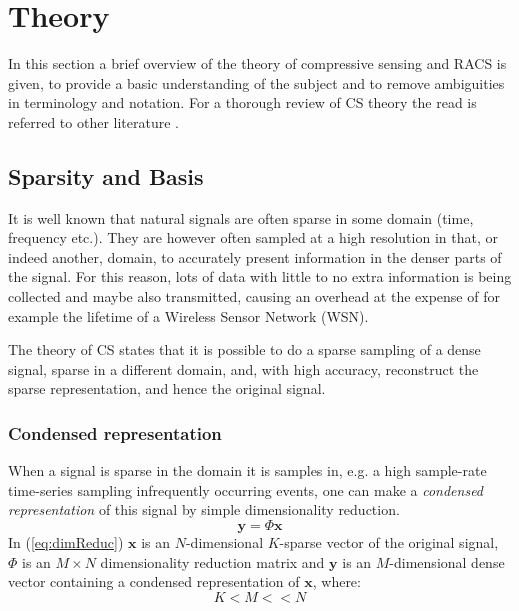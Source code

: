 \documentclass[Main]{subfiles}
\begin{document}
\section{Theory} %
\label{sec:theory}

	In this section a brief overview of the theory of compressive sensing and RACS is given, to provide a basic understanding of the subject and to remove ambiguities in terminology and notation.
	For a thorough review of CS theory the read is referred to other literature \cite{Fazel2011,Candes2008}.

	\subsection{Sparsity and Basis} %
	\label{sub:sparsity_and_basis}

		It is well known that natural signals are often sparse in some domain (time, frequency etc.)\cite{Candes2008}.
		They are however often sampled at a high resolution in that, or indeed another, domain, to accurately present information in the denser parts of the signal.
		For this reason, lots of data with little to no extra information is being collected and maybe also transmitted, causing an overhead at the expense of for example the lifetime of a Wireless Sensor Network (WSN).

		The theory of CS states that it is possible to do a sparse sampling of a dense signal, sparse in a different domain, and, with high accuracy, reconstruct the sparse representation, and hence the original signal.

		\subsubsection{Condensed representation} %
		\label{sub:condensed_representation}

			When a signal is sparse in the domain it is samples in, e.g. a high sample-rate time-series sampling infrequently occurring events, one can make a \emph{condensed representation} of this signal by simple dimensionality reduction.
			\begin{equation}
				\mathbf{y} = \Phi \mathbf{x}
				\label{eq:dimReduc}
			\end{equation}
			In (\ref{eq:dimReduc}) $\mathbf{x}$ is an $N$-dimensional $K$-sparse vector of the original signal, $\Phi$ is an $ M \times N $ dimensionality reduction matrix and $\mathbf{y}$ is an $M$-dimensional dense vector containing a condensed representation of $\mathbf{x} $, where:
			\begin{equation}
				K < M << N 	
			\end{equation}
\end{document}
